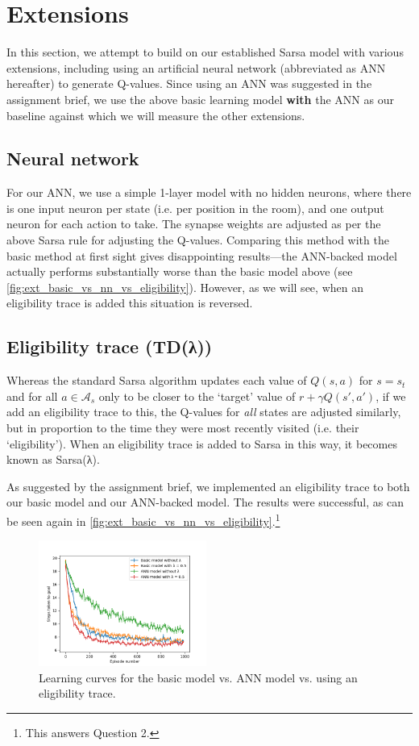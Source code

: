 \documentclass[a4paper, 11pt, twocolumn, final]{article} %
\begin{document}
\section{Extensions} In this section, we attempt to build on our established
Sarsa model with various extensions, including using an artificial neural
network (abbreviated as ANN hereafter) to generate Q-values.  Since using an ANN
was suggested in the assignment brief, we use the above basic learning model
\textbf{with} the ANN as our baseline against which we will measure the other
extensions.

\subsection{Neural network} \label{sec:ext_nn} For our ANN, we use a simple
1-layer model with no hidden neurons, where there is one input neuron per state
(i.e. per position in the room), and one output neuron for each action to take.
The synapse weights are adjusted as per the above Sarsa rule for adjusting the
Q-values.  Comparing this method with the basic method at first sight gives
disappointing results---the ANN-backed model actually performs substantially
worse than the basic model above (see
\autoref{fig:ext_basic_vs_nn_vs_eligibility}).  However, as we will see, when an
eligibility trace is added this situation is reversed.

\subsection{Eligibility trace (TD(λ))} Whereas the standard Sarsa algorithm
updates each value of $Q(s, a)$ for $s = s_t$ and for all $a \in \mathcal{A}_s$
only to be closer to the `target' value of $r + \gamma Q(s', a')$, if we add an
eligibility trace to this, the Q-values for \textit{all} states are adjusted
similarly, but in proportion to the time they were most recently visited (i.e.
their `eligibility').  When an eligibility trace is added to Sarsa in this way,
it becomes known as Sarsa(λ).

As suggested by the assignment brief, we implemented an eligibility trace to
both our basic model and our ANN-backed model.  The results were successful, as
can be seen again in \autoref{fig:ext_basic_vs_nn_vs_eligibility}.\footnote{This
answers Question 2.}

\begin{figure}
  \includegraphics[width=0.49\textwidth]{figures/basic_vs_nn_vs_eligibility.png}
  \caption{Learning curves for the basic model vs. ANN model vs. using an
  eligibility trace.}
  \label{fig:ext_basic_vs_nn_vs_eligibility}
\end{figure}
\end{document}
